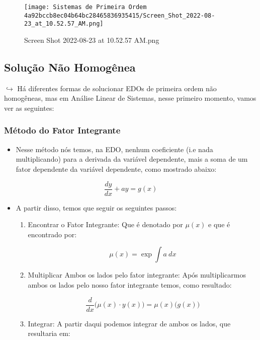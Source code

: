 \documentclass{article}
\begin{document}
\begin{itemize}
\begin{itemize}
  \begin{figure}
  \centering
  \texttt{[image: Sistemas de Primeira Ordem 4a92bccb8ec04b64bc28465836935415/Screen\_Shot\_2022-08-23\_at\_10.52.57\_AM.png]}
  \caption{Screen Shot 2022-08-23 at 10.52.57 AM.png}
  \end{figure}
\end{itemize}

\hypertarget{soluuxe7uxe3o-nuxe3o-homoguxeanea}{%
\subsection{Solução Não
Homogênea}\label{soluuxe7uxe3o-nuxe3o-homoguxeanea}}

\(\hookrightarrow\) Há diferentes formas de solucionar EDOs de primeira
ordem não homogêneas, mas em Análise Linear de Sistemas, nesse primeiro
momento, vamos ver as seguintes:

\hypertarget{muxe9todo-do-fator-integrante}{%
\subsubsection{Método do Fator
Integrante}\label{muxe9todo-do-fator-integrante}}

\begin{itemize}
\tightlist
\item
  Nesse método nós temos, na EDO, nenhum coeficiente (i.e nada
  multiplicando) para a derivada da variável dependente, mais a soma de
  um fator dependente da variável dependente, como mostrado abaixo:
\end{itemize}

\[
\frac{dy}{dx} + ay = g(x)
\]

\begin{itemize}
\tightlist
\item
  A partir disso, temos que seguir os seguintes passos:

  \begin{enumerate}
  \def\labelenumi{\arabic{enumi}.}
  \item
    Encontrar o Fator Integrante: Que é denotado por \(\mu(x)\) e que é
    encontrado por:

    \[
     \mu(x) = \exp \int a \  dx
     \]
  \item
    Multiplicar Ambos os lados pelo fator integrante: Após
    multiplicarmos ambos os lados pelo nosso fator integrante temos,
    como resultado:

    \[
     \frac{d}{dx}\big(\mu(x)\cdot y(x)\big) = \mu(x) \big(g(x)\big)
     \]
  \item
    Integrar: A partir daqui podemos integrar de ambos os lados, que
    resultaria em:


\end{enumerate}
\end{itemize}
\end{itemize}
\end{document}
